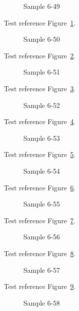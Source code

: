 \begin{figure}[tbhp]
\caption{Sample 6-49}
\label{fig:sample-6-49}
\end{figure}

Test reference Figure~\ref{fig:sample-6-49}.

\begin{figure}[tbhp]
\caption{Sample 6-50}
\label{fig:sample-6-50}
\end{figure}

Test reference Figure~\ref{fig:sample-6-50}.

\begin{figure}[tbhp]
\caption{Sample 6-51}
\label{fig:sample-6-51}
\end{figure}

Test reference Figure~\ref{fig:sample-6-51}.

\begin{figure}[tbhp]
\caption{Sample 6-52}
\label{fig:sample-6-52}
\end{figure}

Test reference Figure~\ref{fig:sample-6-52}.

\begin{figure}[tbhp]
\caption{Sample 6-53}
\label{fig:sample-6-53}
\end{figure}

Test reference Figure~\ref{fig:sample-6-53}.

\begin{figure}[tbhp]
\caption{Sample 6-54}
\label{fig:sample-6-54}
\end{figure}

Test reference Figure~\ref{fig:sample-6-54}.

\begin{figure}[tbhp]
\caption{Sample 6-55}
\label{fig:sample-6-55}
\end{figure}

Test reference Figure~\ref{fig:sample-6-55}.

\begin{figure}[tbhp]
\caption{Sample 6-56}
\label{fig:sample-6-56}
\end{figure}

Test reference Figure~\ref{fig:sample-6-56}.

\begin{figure}[tbhp]
\caption{Sample 6-57}
\label{fig:sample-6-57}
\end{figure}

Test reference Figure~\ref{fig:sample-6-57}.

\begin{figure}[tbhp]
\caption{Sample 6-58}
\label{fig:sample-6-58}
\end{figure}

